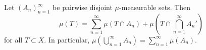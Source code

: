 Let $(A_n)_{n=1}^{\infty}$ be pairwise disjoint $\mu$-measurable sets. Then
$$\mu(T) = \sum_{n=1}^{\infty} \mu(T \cap A_n) + \mu\left(T \cap \bigcap_{n=1}^{\infty} A_n'\right)$$
for all $T \subset X$. In particular, $\mu(\bigcup_{n=1}^{\infty} A_n) = \sum_{n=1}^{\infty} \mu(A_n)$.